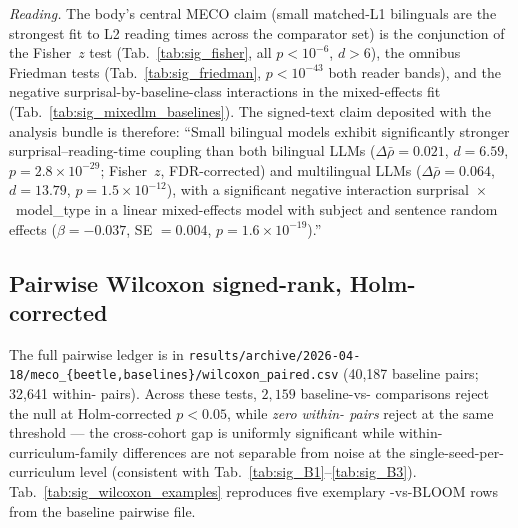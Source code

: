 \emph{Reading.} The body's central MECO claim (small matched-L1 \beetle{} bilinguals are the strongest fit to L2 reading times across the comparator set) is the conjunction of the Fisher~$z$ test (Tab.~\ref{tab:sig_fisher}, all $p < 10^{-6}$, $d > 6$), the omnibus Friedman tests (Tab.~\ref{tab:sig_friedman}, $p < 10^{-43}$ both reader bands), and the negative surprisal-by-baseline-class interactions in the mixed-effects fit (Tab.~\ref{tab:sig_mixedlm_baselines}). The signed-text claim deposited with the analysis bundle is therefore: ``Small \beetle{} bilingual models exhibit significantly stronger surprisal--reading-time coupling than both bilingual LLMs ($\Delta\bar\rho = 0.021$, $d = 6.59$, $p = 2.8{\times}10^{-29}$; Fisher~$z$, FDR-corrected) and multilingual LLMs ($\Delta\bar\rho = 0.064$, $d = 13.79$, $p = 1.5{\times}10^{-12}$), with a significant negative interaction surprisal~$\times$~model\_type in a linear mixed-effects model with subject and sentence random effects ($\beta = -0.037$, SE $= 0.004$, $p = 1.6{\times}10^{-19}$).''

\subsection{Pairwise Wilcoxon signed-rank, Holm-corrected}\label{sec:sig-wilcoxon}

The full pairwise ledger is in \texttt{results/archive/2026-04-18/meco\_\{beetle,baselines\}/wilcoxon\_paired.csv} (40{,}187 baseline pairs; 32{,}641 within-\beetle{} pairs). Across these tests, $2{,}159$ baseline-vs-\beetle{} comparisons reject the null at Holm-corrected $p < 0.05$, while \emph{zero within-\beetle{} pairs} reject at the same threshold --- the cross-cohort gap is uniformly significant while within-\beetle{} curriculum-family differences are not separable from noise at the single-seed-per-curriculum level (consistent with Tab.~\ref{tab:sig_B1}--\ref{tab:sig_B3}). Tab.~\ref{tab:sig_wilcoxon_examples} reproduces five exemplary \beetle{}-vs-BLOOM rows from the baseline pairwise file.

